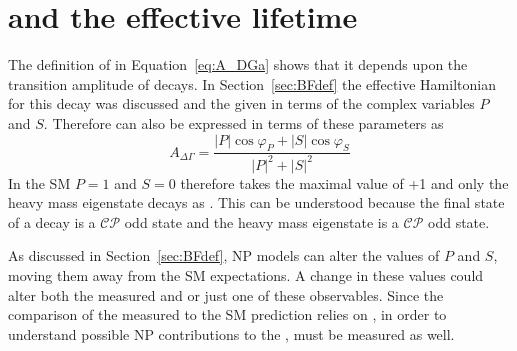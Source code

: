 \section[\ADG and the effective lifetime]{\boldmath{\ADG} and the effective lifetime}
\label{sec:ADG_EL}
The definition of \ADG in Equation~\ref{eq:A_DGa} shows that it depends upon the transition amplitude of \bsmumu decays. In Section~\ref{sec:BFdef} the effective Hamiltonian for this decay was discussed and the \BF given in terms of the complex variables $P$ and $S$. Therefore \ADG can also be expressed in terms of these parameters as~\cite{DeBruyn:2012wk}
\begin{equation}
A_{\Delta \Gamma} = \frac{|P|\cos \varphi_P + |S| \cos \varphi_S}{|P|^2 + |S|^2}
\label{eq:NP_ADG}
\end{equation}
In the SM $P=1$ and $S=0$ therefore \ADG takes the maximal value of +1 and only the heavy mass eigenstate decays as \bsmumu. This can be understood because the final state of a \bsmumu decay is a $\mathcal{CP}$ odd state and the heavy \bs mass eigenstate is a $\mathcal{CP}$ odd state.

As discussed in Section~\ref{sec:BFdef}, NP models can alter the values of $P$ and $S$, moving them away from the SM expectations. A change in these values could alter both the measured \BF and \ADG or just one of these observables. Since the comparison of the measured \BF to the SM prediction relies on \ADG, in order to understand possible NP contributions to the \BF, \ADG must be measured as well. 

